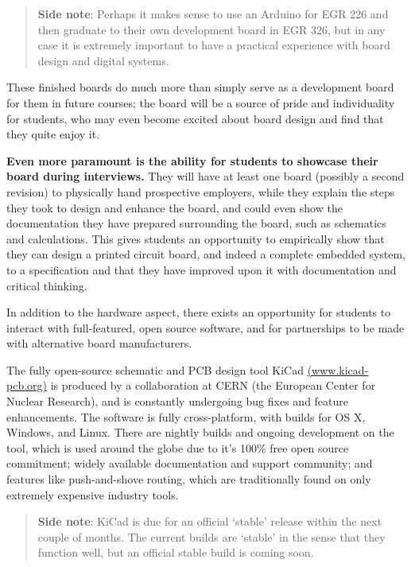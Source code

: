 \documentclass[12pt]{article}
\numberwithin{figure}{section}
\numberwithin{equation}{section}
\begin{document}
{\begin{quote}
\textbf{Side note}: Perhaps it makes sense to use an Arduino for EGR 226
and then graduate to their own development board in EGR 326, but in any
case it is extremely important to have a practical experience with board
design and digital systems.
\end{quote}

These finished boards do much more than simply serve as a development
board for them in future courses; the board will be a source of pride
and individuality for students, who may even become excited about board
design and find that they quite enjoy it.

\bigskip

\textbf{Even more paramount is the ability for students to showcase
their board during interviews.} They will have at least one board
(possibly a second revision) to physically hand prospective employers,
while they explain the steps they took to design and enhance the board,
and could even show the documentation they have prepared surrounding the
board, such as schematics and calculations. This gives students an
opportunity to empirically show that they can design a printed circuit
board, and indeed a complete embedded system, to a specification and
that they have improved upon it with documentation and critical
thinking.

\bigskip

In addition to the hardware aspect, there exists an opportunity for
students to interact with full-featured, open source software, and for
partnerships to be made with alternative board manufacturers.

\bigskip

The fully open-source schematic and PCB design tool KiCad
\href{www.kicad-pcb.org}{(www.kicad-pcb.org)} is produced by a
collaboration at CERN (the European Center for Nuclear Research), and is
constantly undergoing bug fixes and feature enhancements. The software
is fully cross-platform, with builds for OS X, Windows, and Linux. There
are nightly builds and ongoing development on the tool, which is used
around the globe due to it's 100\% free open source commitment; widely
available documentation and support community; and features like
push-and-shove routing, which are traditionally found on only extremely
expensive industry tools.

\begin{quote}
\textbf{Side note}: KiCad is due for an official `stable' release within
the next couple of months. The current builds are `stable' in the sense
that they function well, but an official stable build is coming soon.
\end{quote}

}
\end{document}
